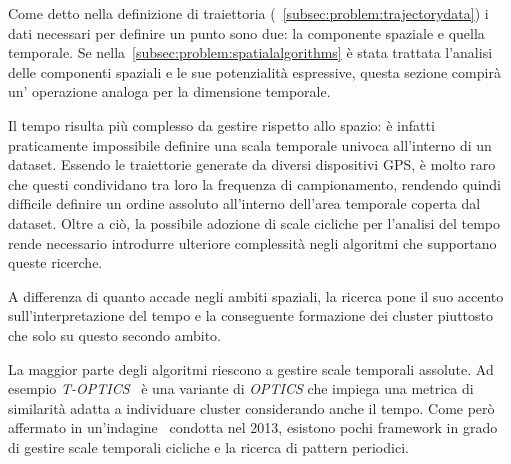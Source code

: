 Come detto nella definizione di traiettoria (~\cref*{subsec:problem:trajectorydata})
i dati necessari per definire un punto sono due: la componente spaziale e quella temporale.
Se nella~\cref*{subsec:problem:spatialalgorithms} è stata trattata l'analisi delle componenti
spaziali e le sue potenzialità espressive, questa sezione compirà un' operazione analoga per la
dimensione temporale.

Il tempo risulta più complesso da gestire rispetto allo spazio: è infatti praticamente impossibile
definire una scala temporale univoca all'interno di un dataset.
Essendo le traiettorie generate da diversi dispositivi GPS, è molto raro che questi condividano tra loro la frequenza
di campionamento, rendendo quindi difficile definire un ordine assoluto all'interno dell'area temporale
coperta dal dataset.
Oltre a ciò, la possibile adozione di scale cicliche per l'analisi del tempo rende necessario
introdurre ulteriore complessità negli algoritmi che supportano queste ricerche.

A differenza di quanto accade negli ambiti spaziali, la ricerca pone il suo accento
sull'interpretazione del tempo e la conseguente formazione dei cluster piuttosto che
solo su questo secondo ambito.

La maggior parte degli algoritmi riescono a gestire scale temporali assolute. Ad esempio
\textit{T-OPTICS}~\cite{nanni2006time} è una variante di \textit{OPTICS} che impiega una metrica di similarità
adatta a individuare cluster considerando anche il tempo.
Come però affermato in un'indagine~\cite{mitsch2013survey} condotta nel 2013, esistono pochi framework in grado di gestire
scale temporali cicliche e la ricerca di pattern periodici.
